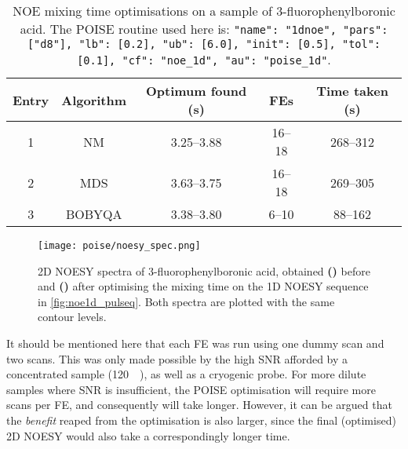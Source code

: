 \begin{table}[!ht] 
    \centering
    \begin{tabular}{ccccc}
        \toprule
        Entry & Algorithm & Optimum found (\unit{\s}) & FEs    & Time taken (\unit{\s}) \\
        \midrule
        1     & NM        & 3.25--3.88              & 16--18 & 268--312             \\
        2     & MDS       & 3.63--3.75              & 16--18 & 269--305             \\
        3     & BOBYQA    & 3.38--3.80              & 6--10  & 88--162              \\
        \bottomrule
    \end{tabular}
    \caption[NOE mixing time optimisations on 3-fluorophenylboronic acid]{
        NOE mixing time optimisations on a sample of 3-fluorophenylboronic acid.
        The POISE routine used here is: \texttt{{"name": "1dnoe", "pars": ["d8"], "lb": [0.2], "ub": [6.0], "init": [0.5], "tol": [0.1], "cf": "noe_1d", "au": "poise_1d"}}.
    }
    \label{tbl:poise_noe_3fpba}
\end{table}

\begin{figure}[htb]
    \centering
    \texttt{[image: poise/noesy\_spec.png]}%
    {\label{fig:poise_noesy_unoptimised}}%
    {\label{fig:poise_noesy_optimised}}%
    \caption[2D NOESY spectra before and after optimisation]{
        2D NOESY spectra of 3-fluorophenylboronic acid, obtained 
        \textbf{()} before and 
        \textbf{()} after optimising the mixing time on the 1D NOESY sequence in \cref{fig:noe1d_pulseq}.
        Both spectra are plotted with the same contour levels.
    }
    \label{fig:poise_noesy}
\end{figure}

It should be mentioned here that each FE was run using one dummy scan and two scans.
This was only made possible by the high SNR afforded by a concentrated sample (\qty{120}{\milli\molar}), as well as a cryogenic probe.
For more dilute samples where SNR is insufficient, the POISE optimisation will require more scans per FE, and consequently will take longer.
However, it can be argued that the \textit{benefit} reaped from the optimisation is also larger, since the final (optimised) 2D NOESY would also take a correspondingly longer time.


